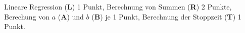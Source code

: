 \begin{bewertung}
Lineare Regression (\textbf{L}) 1 Punkt,
Berechnung von Summen (\textbf{R}) 2 Punkte,
Berechung von $a$ (\textbf{A}) und $b$ (\textbf{B}) je 1 Punkt,
Berechnung der Stoppzeit (\textbf{T}) 1 Punkt.
\end{bewertung}



